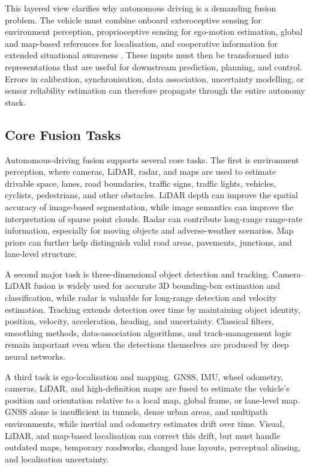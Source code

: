 \documentclass{ieeeaccess}
\begin{document}
This layered view clarifies why autonomous driving is a demanding fusion problem. The vehicle must combine onboard exteroceptive sensing for environment perception, proprioceptive sensing for ego-motion estimation, global and map-based references for localisation, and cooperative information for extended situational awareness \cite{2023:IEEE_ITSM,TANG2023109165}. These inputs must then be transformed into representations that are useful for downstream prediction, planning, and control. Errors in calibration, synchronisation, data association, uncertainty modelling, or sensor reliability estimation can therefore propagate through the entire autonomy stack.

\subsection{Core Fusion Tasks}

Autonomous-driving fusion supports several core tasks. The first is environment perception, where cameras, LiDAR, radar, and maps are used to estimate drivable space, lanes, road boundaries, traffic signs, traffic lights, vehicles, cyclists, pedestrians, and other obstacles. LiDAR depth can improve the spatial accuracy of image-based segmentation, while image semantics can improve the interpretation of sparse point clouds. Radar can contribute long-range range-rate information, especially for moving objects and adverse-weather scenarios. Map priors can further help distinguish valid road areas, pavements, junctions, and lane-level structure.

A second major task is three-dimensional object detection and tracking. Camera--LiDAR fusion is widely used for accurate 3D bounding-box estimation and classification, while radar is valuable for long-range detection and velocity estimation. Tracking extends detection over time by maintaining object identity, position, velocity, acceleration, heading, and uncertainty. Classical filters, smoothing methods, data-association algorithms, and track-management logic remain important even when the detections themselves are produced by deep neural networks.

A third task is ego-localisation and mapping. GNSS, IMU, wheel odometry, cameras, LiDAR, and high-definition maps are fused to estimate the vehicle's position and orientation relative to a local map, global frame, or lane-level map. GNSS alone is insufficient in tunnels, dense urban areas, and multipath environments, while inertial and odometry estimates drift over time. Visual, LiDAR, and map-based localisation can correct this drift, but must handle outdated maps, temporary roadworks, changed lane layouts, perceptual aliasing, and localisation uncertainty.
\end{document}
